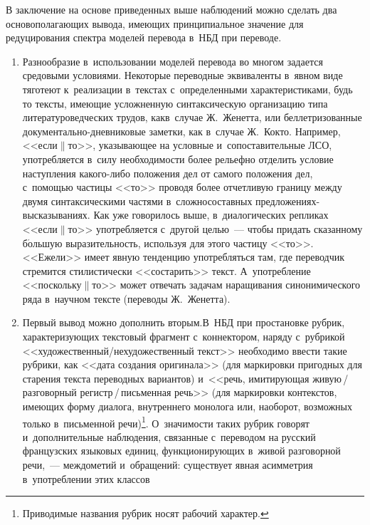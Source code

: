 \begin{multicols}{2}
  В заключение на основе приведенных выше наблюдений можно сделать 
два основополагающих вывода, имеющих принципиальное значение для 
редуцирования спектра моделей перевода в~НБД при переводе.
  \begin{enumerate}[1.]
  \item  Разнообразие в~использовании моделей перевода во многом задается 
средовыми условиями. Некоторые переводные эквиваленты в~явном виде 
тяготеют к~реализации в~текстах с~определенными характеристиками, будь то 
тексты, имеющие усложненную синтаксическую организацию типа 
литературоведческих трудов, как\linebreak в~случае Ж.~Женетта, или 
беллетризованные до\-ку\-мен\-таль\-но-днев\-ни\-ко\-вые заметки, как 
в~случае Ж.~Кокто. Например, <<если$\|$то>>, ука\-зы\-ва\-ющее на условные 
и~сопоставительные ЛСО, употребляется в~силу необходимости более 
рель\-еф\-но отделить условие наступления ка\-ко\-го-ли\-бо положения дел от 
самого положения дел, с~по\-мощью час\-ти\-цы <<то>> проводя более 
от\-чет\-ли\-вую границу между двумя синтаксическими частями 
в~сложносоставных пред\-ло\-же\-ни\-ях-вы\-ска\-зы\-ва\-ни\-ях. Как уже 
говорилось выше, в~диалогических репликах <<если$\|$то>> употреб\-ля\-ет\-ся 
с~другой целью~--- чтобы придать сказанному б$\acute{\mbox{о}}$льшую выразительность, 
используя для этого частицу <<то>>. <<Ежели>> имеет явную тенденцию 
употребляться там, где переводчик стремится стилистически <<состарить>> 
текст. А~упо\-треб\-ле\-ние <<поскольку$\|$то>> может отвечать задачам 
наращивания синонимического ряда в~научном тексте (переводы 
Ж.~Женетта).
\item  Первый вывод можно дополнить вторым.\linebreak В~НБД при простановке 
рубрик, характеризующих текстовый фрагмент с~коннектором, наряду 
с~рубрикой <<ху\-до\-жест\-вен\-ный/не\-ху\-до\-жест\-вен\-ный текст>> 
необходимо ввести такие \mbox{рубрики}, как <<дата создания оригинала>> (для 
маркировки пригодных для старения \mbox{текс\-та} переводных вариантов) 
и~<<речь, ими\-ти\-ру\-ющая жи\-вую\,/\,раз\-го\-вор\-ный  
ре\-гистр\,/\,пись\-мен\-ная речь>> (для маркировки контекстов, име\-ющих 
форму диалога, внут\-рен\-не\-го монолога или, наоборот, возможных только 
в~письменной речи)\footnote{Приводимые названия рубрик носят рабочий характер.}. 
О~значимости таких рубрик говорят и~дополнительные наблюдения, 
связанные с~переводом на русский французских языковых единиц, 
функционирующих в~живой разговорной речи,~--- междометий 
и~обращений: существует явная асимметрия в~употреблении этих классов 

\end{enumerate}
\end{multicols}

